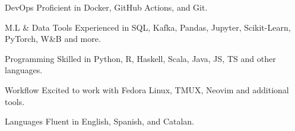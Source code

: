 

\begin{cvskills}

\cvskill
  {DevOps}
  {Proficient in Docker, GitHub Actions, and Git.}

\cvskill
  {M.L \& Data Tools}
  {Experienced in SQL, Kafka, Pandas, Jupyter, Scikit-Learn, PyTorch, W\&B and more.}

\cvskill
  {Programming}
  {Skilled in Python, R, Haskell, Scala, Java, JS, TS and other languages.}

\cvskill
  {Workflow}
  {Excited to work with Fedora Linux, TMUX, Neovim and additional tools.}

\cvskill
  {Languages}
  {Fluent in English, Spanish, and Catalan.}


\end{cvskills}

